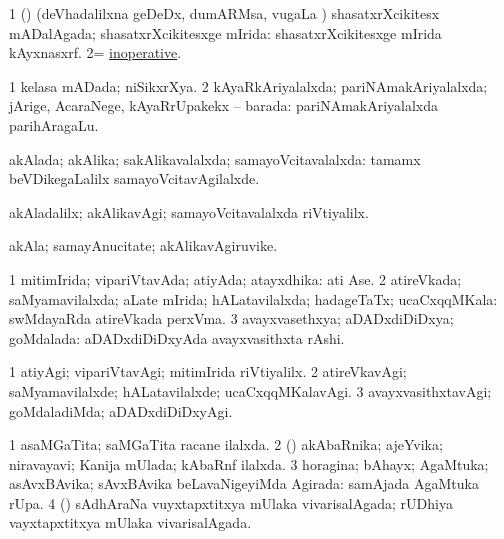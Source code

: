 \bentry
{}
\gl{\gu}
\bmng
\bnum
\num{1} (\shaveY) (deVhadalilxna geDeDx, dumARMsa, \mo vugaLa \vi) shasatxrXcikitesx mADalAgada; shasatxrXcikitesxge mIrida:  shasatxrXcikitesxge mIrida kAyxnasxrf. 
\num{2}=  \hyperlink{inoperative}{inoperative}. 
\enum
\emng
\eentry

\bentry
{}
\gl{\gu}
\bmng
\bnum
\num{1} kelasa mADada; niSikxrXya. 
\num{2} kAyaRkAriyalalxda; pariNAmakAriyalalxda; jArige, AcaraNege, kAyaRrUpakekx -- barada:  pariNAmakAriyalalxda parihAragaLu. 
\enum
\emng
\eentry

\bentry
{}
\gl{\gu}
\bmng
akAlada; akAlika; sakAlikavalalxda; samayoVcitavalalxda:  tamamx beVDikegaLalilx samayoVcitavAgilalxde. 
\emng
\eentry

\bentry
{}
\gl{\kirxvi}
\bmng
akAladalilx; akAlikavAgi; samayoVcitavalalxda riVtiyalilx. 
\emng
\eentry

\bentry
{}
\gl{\nA}
\bmng
akAla; samayAnucitate; akAlikavAgiruvike. 
\emng
\eentry

\bentry
{}
\gl{\gu}
\bmng
\bnum
\num{1} mitimIrida; vipariVtavAda; atiyAda; atayxdhika:  ati Ase. 
\num{2} atireVkada; saMyamavilalxda; aLate mIrida; hALatavilalxda; hadageTaTx; ucaCxqqMKala:  swMdayaRda atireVkada perxVma. 
\num{3} avayxvasethxya; aDADxdiDiDxya; goMdalada:  aDADxdiDiDxyAda avayxvasithxta rAshi. 
\enum
\emng
\eentry

\bentry
{}
\gl{\kirxvi}
\bmng
\bnum
\num{1} atiyAgi; vipariVtavAgi; mitimIrida riVtiyalilx. 
\num{2} atireVkavAgi; saMyamavilalxde; hALatavilalxde; ucaCxqqMKalavAgi. 
\num{3} avayxvasithxtavAgi; goMdaladiMda; aDADxdiDiDxyAgi. 
\enum
\emng
\eentry

\bentry
{}
\gl{\gu}
\bmng
% 
\bnum
\num{1} asaMGaTita; saMGaTita racane ilalxda. 
\num{2} (\ravi) akAbaRnika; ajeYvika; niravayavi; Kanija mUlada; kAbaRnf ilalxda. 
\num{3} horagina; bAhayx; AgaMtuka; asAvxBAvika; sAvxBAvika beLavaNigeyiMda Agirada:  samAjada AgaMtuka rUpa. 
\num{4} (\BAshA) sAdhAraNa vuyxtapxtitxya mUlaka vivarisalAgada; rUDhiya vayxtapxtitxya mUlaka vivarisalAgada. 
\enum
\emng
\eentry

